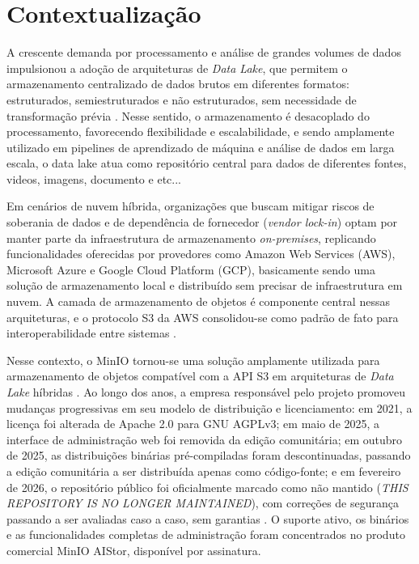 \documentclass[bacharelado]{pre-projeto-computacao}
\begin{document}
\frenchspacing 
\imprimircapa
\imprimirfolhaderosto



\section*{Contextualização}

A crescente demanda por processamento e análise de grandes volumes de dados
impulsionou a adoção de arquiteturas de \textit{Data Lake}, que permitem o
armazenamento centralizado de dados brutos em diferentes formatos:
estruturados, semiestruturados e não estruturados, sem necessidade de
transformação prévia \cite{tast2026comparative}. Nesse sentido, o armazenamento é
desacoplado do processamento, favorecendo flexibilidade e escalabilidade, e sendo
amplamente utilizado em pipelines de aprendizado de máquina e análise de dados
em larga escala, o data lake atua como repositório central para dados de diferentes
fontes, videos, imagens, documento e etc...

Em cenários de nuvem híbrida, organizações que buscam mitigar riscos de soberania
de dados e de dependência de fornecedor (\textit{vendor lock-in}) optam por manter
parte da infraestrutura de armazenamento \textit{on-premises}, replicando
funcionalidades oferecidas por provedores como Amazon Web Services (AWS), Microsoft
Azure e Google Cloud Platform (GCP), basicamente sendo uma solução de armazenamento
local e distribuído sem precisar de infraestrutura em nuvem. A camada de armazenamento
de objetos é componente central nessas arquiteturas, e o protocolo S3 da AWS
consolidou-se como padrão de fato para interoperabilidade entre sistemas
\cite{tast2026comparative}.

Nesse contexto, o MinIO tornou-se uma solução amplamente utilizada para
armazenamento de objetos compatível com a API S3 em arquiteturas de \textit{Data Lake}
híbridas \cite{abdel2026pipeline}. Ao longo dos anos, a empresa responsável pelo
projeto promoveu mudanças progressivas em seu modelo de distribuição e licenciamento:
em 2021, a licença foi alterada de Apache 2.0 para GNU AGPLv3; em maio de 2025, a
interface de administração web foi removida da edição comunitária; em outubro de
2025, as distribuições binárias pré-compiladas foram descontinuadas, passando a
edição comunitária a ser distribuída apenas como código-fonte; e em fevereiro de
2026, o repositório público foi oficialmente marcado como não mantido
(\textit{THIS REPOSITORY IS NO LONGER MAINTAINED}), com correções de segurança
passando a ser avaliadas caso a caso, sem garantias \cite{minio2026repo,
devpro2025, faun2026}. O suporte ativo, os binários e as funcionalidades completas
de administração foram concentrados no produto comercial MinIO AIStor, disponível
por assinatura.
\end{document}
